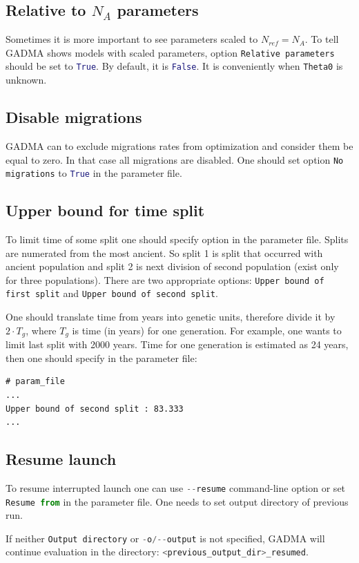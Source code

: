 \documentclass[12pt]{article}
\makeatletter
\newcommand{\py}[1]{\lstinline[language=Python, showstringspaces=False]@#1@}
\makeatother
\begin{document}
\subsection{Relative to $N_A$ parameters}
Sometimes it is more important to see parameters scaled to $N_{ref} = N_A$. To tell GADMA shows models with scaled parameters, option \py{Relative parameters} should be set to \py{True}. By default, it is \py{False}. It is conveniently when \py{Theta0} is unknown.

\subsection{Disable migrations}
GADMA can to exclude migrations rates from optimization and consider them be equal to zero. In that case all migrations are disabled. One should set option \py{No migrations} to \py{True} in the parameter file.

\subsection{Upper bound for time split}
To limit time of some split one should specify option in the parameter file. Splits are numerated from the most ancient. So split 1 is split that occurred with ancient population and split 2 is next division of second population (exist only for three populations). There are two appropriate options: \py{Upper bound of first split} and \py{Upper bound of second split}.

One should translate time from years into genetic units, therefore divide it by $2 \cdot T_g$, where $T_g$ is time (in years) for one generation. For example, one wants to limit last split with 2000 years. Time for one generation is estimated as 24 years, then one should specify in the parameter file:
\begin{lstlisting}
# param_file
...
Upper bound of second split : 83.333
...
\end{lstlisting}

\subsection{Resume launch}
To resume interrupted launch one can use \py{--resume} command-line option or set \py{Resume from} in the parameter file. One needs to set output directory of previous run.

If neither \py{Output directory} or \py{-o/--output} is not specified, GADMA will continue evaluation in the directory: \py{<previous_output_dir>_resumed}.
\end{document}
